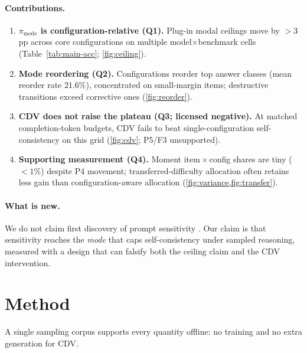 \documentclass{article}
\newcommand{\pmode}{\pi_{\mathrm{mode}}}
\begin{document}
\paragraph{Contributions.}
\begin{enumerate}\itemsep1pt
  \item \textbf{$\pmode$ is configuration-relative (Q1).}
 Plug-in modal ceilings
    move by ${>}3$\,pp across core configurations on multiple
    model$\times$benchmark cells (Table~\ref{tab:main-acc}; \cref{fig:ceiling}).
  \item \textbf{Mode reordering (Q2).} Configurations reorder top answer classes
    (mean reorder rate $21.6\%$), concentrated on small-margin items; destructive
    transitions exceed corrective ones (\cref{fig:reorder}).
  \item \textbf{CDV does not raise the plateau (Q3; licensed negative).}
 At
    matched completion-token budgets, CDV fails to beat single-configuration
    self-consistency on this grid (\cref{fig:cdv}; P5/F3 unsupported).
  \item \textbf{Supporting measurement (Q4).} Moment item\,$\times$\,config shares
    are tiny (${<}1\%$) despite P4 movement; transferred-difficulty allocation
    often retains less gain than configuration-aware allocation
    (\cref{fig:variance,fig:transfer}).
\end{enumerate}

\paragraph{What is new.} We do not claim first discovery of prompt sensitivity
\citep{brittlebench2026,tee2026,prompteval2024,sclar2024formatspread}. Our claim is
that sensitivity reaches the \emph{mode} that caps self-consistency under sampled
reasoning, measured with a design that can falsify both the ceiling claim and the
CDV intervention.

\section{Method}
\label{sec:method}

A single sampling corpus supports every quantity offline: no training and no
extra generation for CDV.
\end{document}
